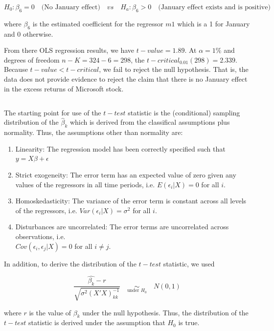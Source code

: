 $$
H_0: \beta_6 = 0 \quad \text{(No January effect)} \quad vs \quad
H_a: \beta_6 > 0 \quad \text{(January effect exists and is positive)}
$$

where $\beta_6$ is the estimated coefficient for the regressor $m1$ which is a 1 for January and 0 otherwise. 

\medskip 

From there OLS regression results, we have $t-value = 1.89$. At $\alpha=1\%$ and degrees of freedom  $n-K = 324 - 6 = 298$, the $t-critical_{0.01}(298) = 2.339$. Because $t-value < t-critical$, we fail to reject the null hypothesis. That is, the data does not provide evidence to reject the claim that there is no January effect in the excess returns of Microsoft stock.

\subsection{}

The starting point for use of the $t-test$ statistic is the (conditional) sampling distribution of the $\hat{\beta}_k$ which is derived from the classifical assumptions plus normality. Thus, the assumptions other than normality are:

\begin{enumerate}[label=(A\arabic*)]
    \item Linearity: The regression model has been correctly specified such that $y = X\beta + \epsilon$ 
    \item Strict exogeneity: The error term has an expected value of zero given any values of the regressors in all time periods, i.e. $E(\epsilon_i | X) = 0$ for all $i$.
    \item Homoskedasticity: The variance of the error term is constant across all levels of the regressors, i.e. $Var(\epsilon_i | X) = \sigma^2$ for all $i$.
    \item Disturbances are uncorrelated: The error terms are uncorrelated across observations,
    i.e. \\ $Cov(\epsilon_i, \epsilon_j | X) = 0$ for all $i \neq j$.
\end{enumerate} 

In addition, to derive the distribution of the $t-test$ statistic, we used 

$$\dfrac{\hat{\beta_k} - r}{\sqrt{\sigma^2(X'X)^{-1}_{kk}}} \quad \underset{\text{under }H_0}{\sim} \quad  N(0,1)$$

where $r$ is the value of $\beta_k$ under the null hypothesis. Thus, the distribution of the $t-test$ statistic is derived under the assumption that $H_0$ is true.


